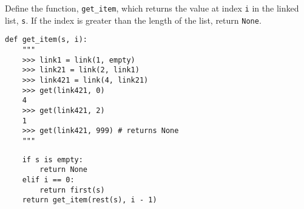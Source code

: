 \begin{blocksection}
\question Define the function, \lstinline$get_item$, which returns the value at index \lstinline$i$ in the linked list, \lstinline$s$. If the index is greater than the length of the list, return \lstinline$None$.

\begin{lstlisting}
def get_item(s, i):
    """
    >>> link1 = link(1, empty)
    >>> link21 = link(2, link1)
    >>> link421 = link(4, link21)
    >>> get(link421, 0)
    4
    >>> get(link421, 2)
    1
    >>> get(link421, 999) # returns None
    """
\end{lstlisting}

\begin{solution}[0.5in]
\begin{lstlisting}
    if s is empty:
        return None
    elif i == 0:
        return first(s)
    return get_item(rest(s), i - 1)
\end{lstlisting}
\end{solution}
\end{blocksection}